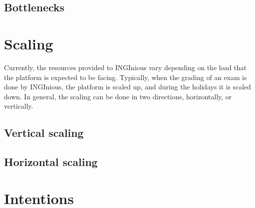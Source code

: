 \subsection{Bottlenecks}

\section{Scaling}
Currently, the resources provided to INGInious vary depending on the load that the platform is expected to be facing.  Typically, when the grading of an exam is done by INGInious, the platform is scaled up, and during the holidays it is scaled down.  
In general, the scaling can be done in two directions, horizontally, or vertically.

\subsection{Vertical scaling}

\subsection{Horizontal scaling}

\section{Intentions}
